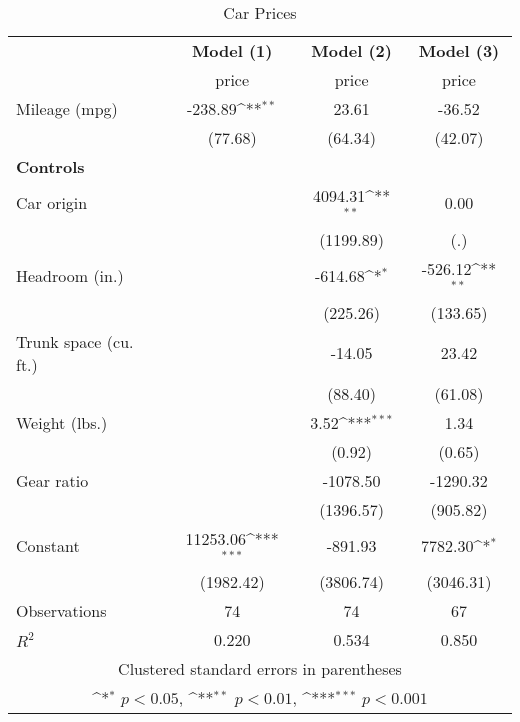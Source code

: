 \begin{table}[htbp]\centering
\def\sym#1{\ifmmode^{#1}\else\(^{#1}\)\fi}
\caption{Car Prices \label{reg_prices}}
\begin{tabular}{l*{3}{c}}
\toprule
                    &\multicolumn{1}{c}{\textbf{Model (1)}}&\multicolumn{1}{c}{\textbf{Model (2)}}&\multicolumn{1}{c}{\textbf{Model (3)}}\\
                    &       price         &       price         &       price         \\
\midrule
Mileage (mpg)       &     -238.89\sym{**} &       23.61         &      -36.52         \\
                    &     (77.68)         &     (64.34)         &     (42.07)         \\
\textbf{Controls}   &                     &                     &                     \\
Car origin          &                     &     4094.31\sym{**} &        0.00         \\
                    &                     &   (1199.89)         &         (.)         \\
Headroom (in.)      &                     &     -614.68\sym{*}  &     -526.12\sym{**} \\
                    &                     &    (225.26)         &    (133.65)         \\
Trunk space (cu. ft.)&                     &      -14.05         &       23.42         \\
                    &                     &     (88.40)         &     (61.08)         \\
Weight (lbs.)       &                     &        3.52\sym{***}&        1.34         \\
                    &                     &      (0.92)         &      (0.65)         \\
Gear ratio          &                     &    -1078.50         &    -1290.32         \\
                    &                     &   (1396.57)         &    (905.82)         \\
Constant            &    11253.06\sym{***}&     -891.93         &     7782.30\sym{*}  \\
                    &   (1982.42)         &   (3806.74)         &   (3046.31)         \\
\midrule
Observations        &          74         &          74         &          67         \\
\(R^{2}\)           &       0.220         &       0.534         &       0.850         \\
\bottomrule
\multicolumn{4}{c}{\footnotesize Clustered standard errors in parentheses}\\
\multicolumn{4}{c}{\footnotesize \sym{*} \(p<0.05\), \sym{**} \(p<0.01\), \sym{***} \(p<0.001\)}\\
\end{tabular}
\end{table}
